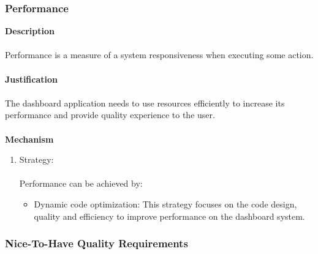			\subsubsection*{Performance}
			\textbf{Description}\\\\
			Performance is a measure of a system responsiveness when executing some action.\\\\
			\textbf{Justification}\\\\
			The dashboard application needs to use resources efficiently to increase its performance and provide quality experience to the user.\\\\
			\textbf{Mechanism}
			\begin{enumerate}
				\item Strategy:\\\\
				Performance can be achieved by:
				\begin{itemize}
				\item Dynamic code optimization: This strategy focuses on the code design, quality and efficiency to improve performance on the dashboard system.  
				\end{itemize}
			\end{enumerate}	
			
		\newpage
		\subsubsection{Nice-To-Have Quality Requirements}
